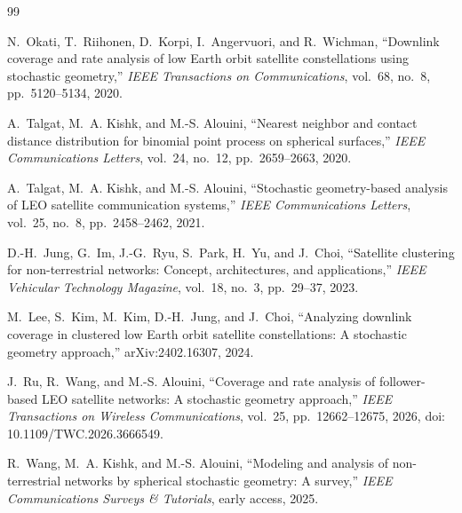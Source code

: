 \documentclass[UTF8,a4paper,11pt]{ctexart}
\begin{document}
\begin{thebibliography}{99}

N.~Okati, T.~Riihonen, D.~Korpi, I.~Angervuori, and R.~Wichman,
``Downlink coverage and rate analysis of low Earth orbit satellite constellations using stochastic geometry,''
\emph{IEEE Transactions on Communications}, vol.~68, no.~8, pp.~5120--5134, 2020.

A.~Talgat, M.~A. Kishk, and M.-S. Alouini,
``Nearest neighbor and contact distance distribution for binomial point process on spherical surfaces,''
\emph{IEEE Communications Letters}, vol.~24, no.~12, pp.~2659--2663, 2020.

A.~Talgat, M.~A. Kishk, and M.-S. Alouini,
``Stochastic geometry-based analysis of LEO satellite communication systems,''
\emph{IEEE Communications Letters}, vol.~25, no.~8, pp.~2458--2462, 2021.

D.-H.~Jung, G.~Im, J.-G.~Ryu, S.~Park, H.~Yu, and J.~Choi,
``Satellite clustering for non-terrestrial networks: Concept, architectures, and applications,''
\emph{IEEE Vehicular Technology Magazine}, vol.~18, no.~3, pp.~29--37, 2023.

M.~Lee, S.~Kim, M.~Kim, D.-H.~Jung, and J.~Choi,
``Analyzing downlink coverage in clustered low Earth orbit satellite constellations: A stochastic geometry approach,''
arXiv:2402.16307, 2024.

J.~Ru, R.~Wang, and M.-S. Alouini,
``Coverage and rate analysis of follower-based LEO satellite networks: A stochastic geometry approach,''
\emph{IEEE Transactions on Wireless Communications}, vol.~25, pp.~12662--12675, 2026,
doi: 10.1109/TWC.2026.3666549.

R.~Wang, M.~A. Kishk, and M.-S. Alouini,
``Modeling and analysis of non-terrestrial networks by spherical stochastic geometry: A survey,''
\emph{IEEE Communications Surveys \& Tutorials}, early access, 2025.

\end{thebibliography}
\end{document}
